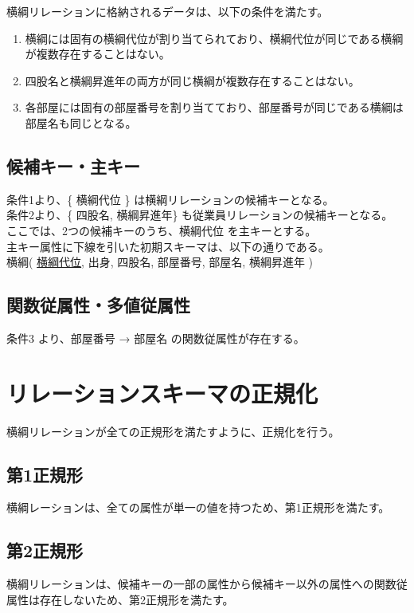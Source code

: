 \documentclass[a4j,12pt]{jreport}
\begin{document}
横綱リレーションに格納されるデータは、以下の条件を満たす。

\begin{enumerate}
\item 横綱には固有の横綱代位が割り当てられており、横綱代位が同じである横綱が複数存在することはない。
\item 四股名と横綱昇進年の両方が同じ横綱が複数存在することはない。
\item 各部屋には固有の部屋番号を割り当てており、部屋番号が同じである横綱は部屋名も同じとなる。
\end{enumerate}


\subsection{候補キー・主キー}
条件1より、\{ 横綱代位 \} は横綱リレーションの候補キーとなる。\\
条件2より、\{ 四股名, 横綱昇進年\} も従業員リレーションの候補キーとなる。\\
ここでは、2つの候補キーのうち、横綱代位 を主キーとする。\\
主キー属性に下線を引いた初期スキーマは、以下の通りである。\\

横綱( \underline{横綱代位}, 出身, 四股名, 部屋番号, 部屋名, 横綱昇進年 )


\subsection{関数従属性・多値従属性}
条件3 より、部屋番号 → 部屋名 の関数従属性が存在する。\\

\section{リレーションスキーマの正規化}
横綱リレーションが全ての正規形を満たすように、正規化を行う。


\subsection{第1正規形}
横綱レーションは、全ての属性が単一の値を持つため、第1正規形を満たす。\\


\subsection{第2正規形}
横綱リレーションは、候補キーの一部の属性から候補キー以外の属性への関数従属性は存在しないため、第2正規形を満たす。\\
\end{document}
